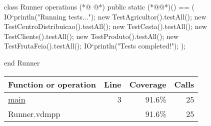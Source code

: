 \begin{vdmpp}[breaklines=true]
class Runner
  operations
(*@
\label{main:3}
@*)
    public static (*@@*)() == (
      IO`println("Running tests...");
      new TestAgricultor().testAll();
      new TestCentroDistribuicao().testAll();
      new TestCesta().testAll();
      new TestCliente().testAll();
      new TestProduto().testAll();
      new TestFrutaFeia().testAll();
      IO`println("Tests completed!");
    );
    
end Runner
\end{vdmpp}
\bigskip
\begin{longtable}{|l|r|r|r|}
\hline
Function or operation & Line & Coverage & Calls \\
\hline
\hline
\hyperref[main:3]{main} & 3&91.6\% & 25 \\
\hline
\hline
Runner.vdmpp & & 91.6\% & 25 \\
\hline
\end{longtable}

